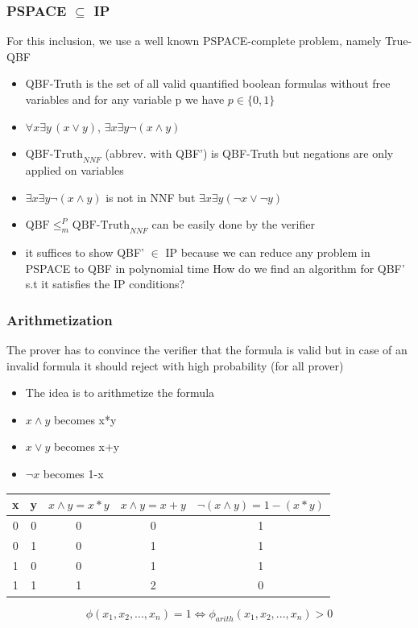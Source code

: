 \documentclass[hyperref={pdfpagelabels=false},t,10pt]{beamer}
\begin{document}
\begin{frame}
  \frametitle{PSPACE $\subseteq$ IP}
  For this inclusion, we use a well known PSPACE-complete problem, namely True-QBF
  \pause
  \begin{itemize}
  \item QBF-Truth is the set of all valid quantified boolean formulas without free variables and for any variable p we have $p\in \{0,1\}$
  \pause
  \item $\forall x \exists y \, (x \lor y)$, $\exists x \exists y \neg(x \land y)$
  \pause
  \item $\mbox{QBF-Truth}_{NNF}$ (abbrev. with QBF') is QBF-Truth but negations are only applied on variables
  \item $\exists x \exists y \neg(x\land y)$ is not in NNF but $\exists x \exists y (\neg x \lor \neg y)$
  \pause
  \item $\mbox{QBF} \leq^P_m \mbox{QBF-Truth}_{NNF}$ can be easily done by the verifier 
  \item it suffices to show QBF' $\in$ IP because we can reduce any problem in PSPACE to QBF in polynomial time \newline \newline
  How do we find an algorithm for QBF' s.t it satisfies the IP conditions?

  \end{itemize}
\end{frame}

\begin{frame}
  \frametitle{Arithmetization}
  The prover has to convince the verifier that the formula is valid but in case of 
  an invalid formula it should reject with high probability (for all prover) \newline \pause

  \begin{itemize}
    \item The idea is to arithmetize the formula \pause
    \item $x \land y$ becomes x*y
    \item $x \lor y$ becomes x+y
    \item $\neg x$ becomes 1-x \pause
  \end{itemize}
    \begin{tabular}{|c|c|c|c|c|}
      \hline
      x & y & $x\land y = x*y$& $x\land y = x+y $ &$\neg (x\land y) = 1- (x * y)$ \\ 
      \hline
      0 & 0 & 0 & 0 & 1\\ 
      0 & 1 & 0 & 1 & 1\\
      1 & 0 & 0 & 1 & 1\\
      1 & 1 & 1 & 2 & 0\\ 
    \end{tabular}
    $$\phi(x_1,x_2,...,x_n) = 1 \Leftrightarrow \phi_{arith}(x_1,x_2,...,x_n) > 0$$
\end{frame}
\end{document}
